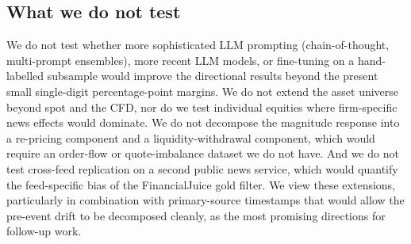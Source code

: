 \subsection{What we do not test}

We do not test whether more sophisticated LLM prompting
(chain-of-thought, multi-prompt ensembles), more recent LLM models,
or fine-tuning on a hand-labelled subsample would improve the
directional results beyond the present small single-digit
percentage-point margins. We do not
extend the asset universe beyond \eurusd{} spot and the
\ndx{} CFD, nor do we test individual equities where firm-specific
news effects would dominate. We do not decompose the magnitude
response into a re-pricing component and a liquidity-withdrawal
component, which would require an order-flow or quote-imbalance
dataset we do not have. And we do not test cross-feed replication on
a second public news service, which would quantify the
feed-specific bias of the FinancialJuice gold filter. We view these
extensions, particularly in combination with primary-source
timestamps that would allow the pre-event drift to be decomposed
cleanly, as the most promising directions for follow-up work.
